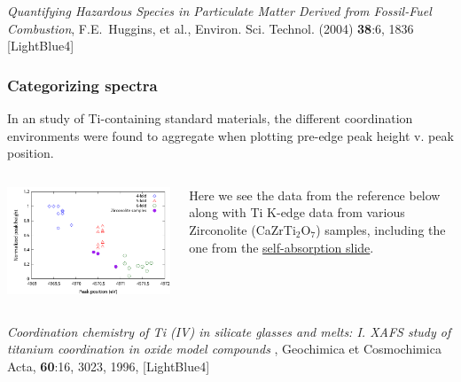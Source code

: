 \documentclass[10pt, xcolor=x11names, compress]{beamer}
\begin{document}
\begin{frame}
  \begin{bottomnote}[0.5][19.25]
    \textit{Quantifying Hazardous Species in Particulate Matter
      Derived from Fossil-Fuel Combustion}, F.E.\ Huggins, et al.,
    Environ. Sci. Technol. (2004) \textbf{38}:6, 1836
    [LightBlue4]
  \end{bottomnote}
\end{frame}

\begin{frame}
  \frametitle{Categorizing spectra}
  
  In an study of Ti-containing standard materials, the different
  coordination environments were found to aggregate when plotting
  pre-edge peak height v. peak position.

  \begin{columns}
    \begin{column}{0.6\linewidth}
      \includegraphics[width=\linewidth]{images/Farges/farges.png}
    \end{column}
    \begin{column}{0.4\linewidth}
      Here we see the data from the reference below along with Ti
      K-edge data from various Zirconolite (CaZrTi$_2$O$_7$) samples,
      including the one from the
      \hyperlink{selfabs}{\color{Purple4}self-absorption slide}.
    \end{column}
  \end{columns}

  \begin{bottomnote}[0.7][19]
    \textit{Coordination chemistry of Ti (IV) in silicate glasses and
      melts: I. XAFS study of titanium coordination in oxide model
      compounds }, Geochimica et Cosmochimica Acta, \textbf{60}:16,
    3023, 1996, [LightBlue4]
  \end{bottomnote}
\end{frame}
\end{document}

